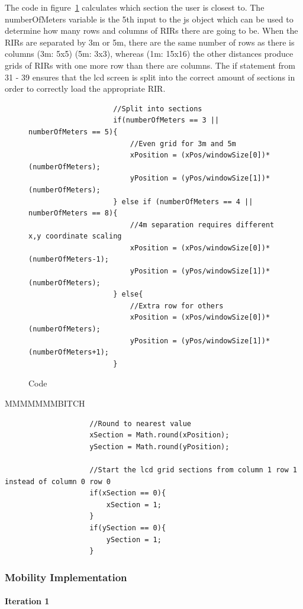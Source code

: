 \documentclass[../../main.tex]{subfiles}
\begin{document}
				The code in figure~\ref{code2} calculates which section the user is closest to. The numberOfMeters variable is the 5th input to the js object which can be used to determine how many rows and columns of RIRs there are going to be. When the RIRs are separated by 3m or 5m, there are the same number of rows as there is columns (3m: 5x5) (5m: 3x3), whereas (1m: 15x16) the other distances produce grids of RIRs with one more row than there are columns. The if statement from 31 - 39 ensures that the lcd screen is split into the correct amount of sections in order to correctly load the appropriate RIR.

				\begin{figure}
				\begin{lstlisting}
					//Split into sections
					if(numberOfMeters == 3 || numberOfMeters == 5){
						//Even grid for 3m and 5m
						xPosition = (xPos/windowSize[0])*(numberOfMeters);
						yPosition = (yPos/windowSize[1])*(numberOfMeters);
					} else if (numberOfMeters == 4 || numberOfMeters == 8){
						//4m separation requires different x,y coordinate scaling
						xPosition = (xPos/windowSize[0])*(numberOfMeters-1);
						yPosition = (yPos/windowSize[1])*(numberOfMeters);
					} else{
						//Extra row for others
						xPosition = (xPos/windowSize[0])*(numberOfMeters); 
						yPosition = (yPos/windowSize[1])*(numberOfMeters+1);
					}	
					\end{lstlisting}
					\caption{Code}
					\label{code2}
					\end{figure}
				
					MMMMMMMBITCH
				

					\begin{lstlisting}
					//Round to nearest value
					xSection = Math.round(xPosition);
					ySection = Math.round(yPosition); 
					
					//Start the lcd grid sections from column 1 row 1 instead of column 0 row 0
					if(xSection == 0){
						xSection = 1; 
					}
					if(ySection == 0){
						ySection = 1;
					}
				\end{lstlisting}


	

		\subsubsection{Mobility Implementation}

		 \paragraph{Iteration 1}
\end{document}
